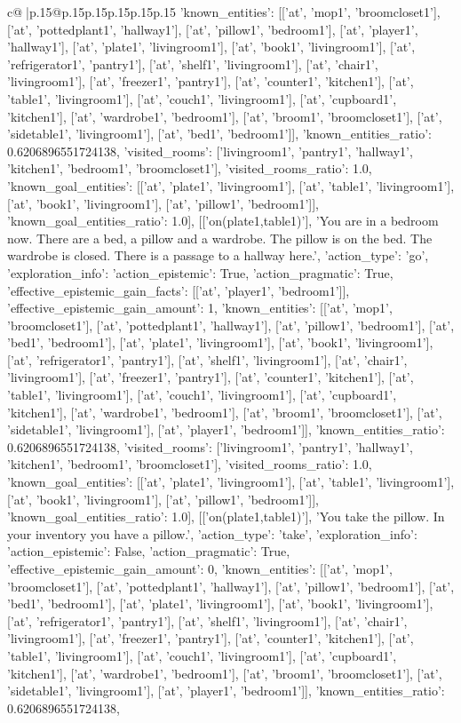 \documentclass{article}
\begin{document}
{\begin{supertabular}{c@{$\;$}|p{.15\linewidth}@{}p{.15\linewidth}p{.15\linewidth}p{.15\linewidth}p{.15\linewidth}p{.15\linewidth}}
{{{'known_entities': [['at', 'mop1', 'broomcloset1'], ['at', 'pottedplant1', 'hallway1'], ['at', 'pillow1', 'bedroom1'], ['at', 'player1', 'hallway1'], ['at', 'plate1', 'livingroom1'], ['at', 'book1', 'livingroom1'], ['at', 'refrigerator1', 'pantry1'], ['at', 'shelf1', 'livingroom1'], ['at', 'chair1', 'livingroom1'], ['at', 'freezer1', 'pantry1'], ['at', 'counter1', 'kitchen1'], ['at', 'table1', 'livingroom1'], ['at', 'couch1', 'livingroom1'], ['at', 'cupboard1', 'kitchen1'], ['at', 'wardrobe1', 'bedroom1'], ['at', 'broom1', 'broomcloset1'], ['at', 'sidetable1', 'livingroom1'], ['at', 'bed1', 'bedroom1']], 'known_entities_ratio': 0.6206896551724138, 'visited_rooms': ['livingroom1', 'pantry1', 'hallway1', 'kitchen1', 'bedroom1', 'broomcloset1'], 'visited_rooms_ratio': 1.0, 'known_goal_entities': [['at', 'plate1', 'livingroom1'], ['at', 'table1', 'livingroom1'], ['at', 'book1', 'livingroom1'], ['at', 'pillow1', 'bedroom1']], 'known_goal_entities_ratio': 1.0}}], [['on(plate1,table1)'], 'You are in a bedroom now. There are a bed, a pillow and a wardrobe. The pillow is on the bed. The wardrobe is closed. There is a passage to a hallway here.', {'action_type': 'go', 'exploration_info': {'action_epistemic': True, 'action_pragmatic': True, 'effective_epistemic_gain_facts': [['at', 'player1', 'bedroom1']], 'effective_epistemic_gain_amount': 1, 'known_entities': [['at', 'mop1', 'broomcloset1'], ['at', 'pottedplant1', 'hallway1'], ['at', 'pillow1', 'bedroom1'], ['at', 'bed1', 'bedroom1'], ['at', 'plate1', 'livingroom1'], ['at', 'book1', 'livingroom1'], ['at', 'refrigerator1', 'pantry1'], ['at', 'shelf1', 'livingroom1'], ['at', 'chair1', 'livingroom1'], ['at', 'freezer1', 'pantry1'], ['at', 'counter1', 'kitchen1'], ['at', 'table1', 'livingroom1'], ['at', 'couch1', 'livingroom1'], ['at', 'cupboard1', 'kitchen1'], ['at', 'wardrobe1', 'bedroom1'], ['at', 'broom1', 'broomcloset1'], ['at', 'sidetable1', 'livingroom1'], ['at', 'player1', 'bedroom1']], 'known_entities_ratio': 0.6206896551724138, 'visited_rooms': ['livingroom1', 'pantry1', 'hallway1', 'kitchen1', 'bedroom1', 'broomcloset1'], 'visited_rooms_ratio': 1.0, 'known_goal_entities': [['at', 'plate1', 'livingroom1'], ['at', 'table1', 'livingroom1'], ['at', 'book1', 'livingroom1'], ['at', 'pillow1', 'bedroom1']], 'known_goal_entities_ratio': 1.0}}], [['on(plate1,table1)'], 'You take the pillow. In your inventory you have a pillow.', {'action_type': 'take', 'exploration_info': {'action_epistemic': False, 'action_pragmatic': True, 'effective_epistemic_gain_amount': 0, 'known_entities': [['at', 'mop1', 'broomcloset1'], ['at', 'pottedplant1', 'hallway1'], ['at', 'pillow1', 'bedroom1'], ['at', 'bed1', 'bedroom1'], ['at', 'plate1', 'livingroom1'], ['at', 'book1', 'livingroom1'], ['at', 'refrigerator1', 'pantry1'], ['at', 'shelf1', 'livingroom1'], ['at', 'chair1', 'livingroom1'], ['at', 'freezer1', 'pantry1'], ['at', 'counter1', 'kitchen1'], ['at', 'table1', 'livingroom1'], ['at', 'couch1', 'livingroom1'], ['at', 'cupboard1', 'kitchen1'], ['at', 'wardrobe1', 'bedroom1'], ['at', 'broom1', 'broomcloset1'], ['at', 'sidetable1', 'livingroom1'], ['at', 'player1', 'bedroom1']], 'known_entities_ratio': 0.6206896551724138, }}}
\end{supertabular}}
\end{document}
